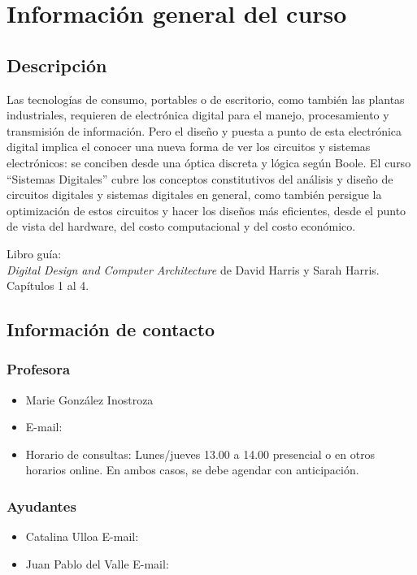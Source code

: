 \chapter*{Información general del curso}

\section{Descripción}
Las tecnologías de consumo, portables o de escritorio, como también las plantas industriales, requieren de electrónica digital para el manejo, procesamiento y transmisión de información. Pero el diseño y puesta a punto de esta electrónica digital implica el conocer una nueva forma de ver los circuitos y sistemas electrónicos: se conciben desde una óptica discreta y lógica según Boole. El curso “Sistemas Digitales” cubre los conceptos constitutivos del análisis y diseño de circuitos digitales y sistemas digitales en general, como también persigue la optimización de estos circuitos y hacer los diseños más eficientes, desde el punto de vista del hardware, del costo computacional y del costo económico.

Libro guía:\\
\textit{Digital Design and Computer Architecture} de David Harris y Sarah Harris. Capítulos 1 al 4.

 \section{Información de contacto}
 \subsection{Profesora}
\begin{itemize}
\item Marie González Inostroza
    \item E-mail: 
  \item Horario de consultas: Lunes/jueves 13.00 a 14.00 presencial o en otros horarios online. En ambos casos, se debe agendar con anticipación.
\end{itemize}
\subsection{Ayudantes}
\begin{itemize}
    \item Catalina Ulloa 
        E-mail: 
    \item Juan Pablo del Valle
E-mail: 
\end{itemize}

